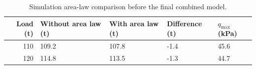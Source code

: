 \begin{table}[htbp]
\caption{Simulation area-law comparison before the final combined model.}
\label{tab:src17}
\small
\setlength{\tabcolsep}{3.5pt}
\begin{tabularx}{\linewidth}{@{}rXXXX@{}}
\toprule
Load (t) & Without area law (t) & With area law (t) & Difference (t) & $q_{\max}$ (kPa) \\
\midrule
110 & 109.2 & 107.8 & -1.4 & 45.6 \\
120 & 114.8 & 113.5 & -1.3 & 44.7 \\
\bottomrule
\end{tabularx}
\end{table}
